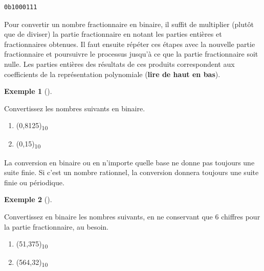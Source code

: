 \documentclass[
  letterpaper,
]{scrbook}
\providecommand{\tightlist}{%
  \setlength{\itemsep}{0pt}\setlength{\parskip}{0pt}}\usepackage{longtable,booktabs,array}
\theoremstyle{definition}
\newtheorem{example}{Exemple}[chapter]
\theoremstyle{definition}
\theoremstyle{plain}
\theoremstyle{remark}
\begin{document}
\begin{verbatim}
0b1000111
\end{verbatim}

Pour convertir un nombre fractionnaire en binaire, il suffit de
multiplier (plutôt que de diviser) la partie fractionnaire en notant les
parties entières et fractionnaires obtenues. Il faut ensuite répéter ces
étapes avec la nouvelle partie fractionnaire et poursuivre le processus
jusqu'à ce que la partie fractionnaire soit nulle. Les parties entières
des résultats de ces produits correspondent aux coefficients de la
représentation polynomiale (\textbf{lire de haut en bas}).

\leavevmode{}%
\begin{example}[]\label{exm-conversion-fractionnaire-binaire}

Convertissez les nombres suivants en binaire.

\begin{enumerate}
\def\labelenumi{\alph{enumi})}
\tightlist
\item
  (0,8125)\textsubscript{10}
\item
  (0,15)\textsubscript{10}
\end{enumerate}

\end{example}

\begin{tcolorbox}[enhanced jigsaw, colframe=quarto-callout-important-color-frame, bottomtitle=1mm, coltitle=black, breakable, arc=.35mm, title=\textcolor{quarto-callout-important-color}{\faExclamation}\hspace{0.5em}{Important}, opacitybacktitle=0.6, colback=white, opacityback=0, colbacktitle=quarto-callout-important-color!10!white, leftrule=.75mm, rightrule=.15mm, titlerule=0mm, toprule=.15mm, toptitle=1mm, left=2mm, bottomrule=.15mm]

La conversion en binaire ou en n'importe quelle base ne donne pas
toujours une suite finie. Si c'est un nombre rationnel, la conversion
donnera toujours une suite finie ou périodique.

\end{tcolorbox}

\leavevmode{}%
\begin{example}[]\label{exm-conversion-binaire-totale}

Convertissez en binaire les nombres suivants, en ne conservant que 6
chiffres pour la partie fractionnaire, au besoin.

\begin{enumerate}
\def\labelenumi{\alph{enumi})}
\tightlist
\item
  (51,375)\textsubscript{10}
\item
  (564,32)\textsubscript{10}
\end{enumerate}

\end{example}
\end{document}
